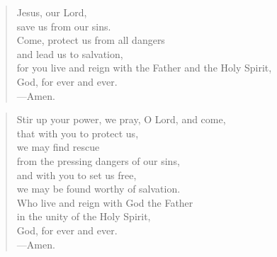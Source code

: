 \prayer

\setlength{\vleftmargin}{\prayerleftmargini}

\begin{verse}
Jesus, our Lord,\\
save us from our sins.\\
Come, protect us from all dangers\\
and lead us to salvation,\\
for you live and reign with the Father and the Holy Spirit,\\
God, for ever and ever.\\
{\color{red}---\thinspace}Amen.
\end{verse}


\begin{verse}
Stir up your power, we pray, O Lord, and come,\\
that with you to protect us,\\
we may find rescue\\
from the pressing dangers of our sins,\\
and with you to set us free,\\
we may be found worthy of salvation.\\
Who live and reign with God the Father\\
in the unity of the Holy Spirit,\\
God, for ever and ever.\\
{\color{red}---\thinspace}Amen.
\end{verse}

\setlength{\vleftmargin}{\defleftmargini}